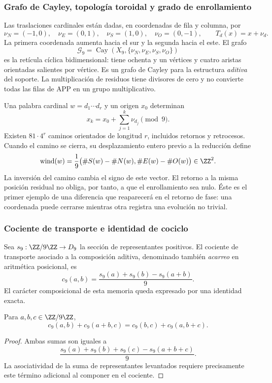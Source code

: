 \subsubsection{Grafo de Cayley, topología toroidal y grado de enrollamiento}

Las traslaciones cardinales están dadas, en coordenadas de fila y columna, por
\[
 \nu_N=(-1,0),\quad\nu_E=(0,1),\quad
 \nu_S=(1,0),\quad\nu_O=(0,-1),\qquad T_d(x)=x+\nu_d.
\]
La primera coordenada aumenta hacia el sur y la segunda hacia el este. El grafo
\[
 \mathscr G_9=\operatorname{Cay}(X_9,\{\nu_N,\nu_E,\nu_S,\nu_O\})
\]
es la retícula cíclica bidimensional: tiene ochenta y un vértices y cuatro aristas orientadas salientes por vértice. Es un grafo de Cayley para la estructura \emph{aditiva} del soporte. La multiplicación de residuos tiene divisores de cero y no convierte todas las filas de APP en un grupo multiplicativo.

Una palabra cardinal \(w=d_1\cdots d_r\) y un origen \(x_0\) determinan
\[
 x_k=x_0+\sum_{j=1}^k\nu_{d_j}\pmod9.
\]
Existen \(81\cdot4^r\) caminos orientados de longitud \(r\), incluidos retornos y retrocesos. Cuando el camino se cierra, su desplazamiento entero previo a la reducción define
\begin{equation}
 \operatorname{wind}(w)=\frac19
 \bigl(\#S(w)-\#N(w),\#E(w)-\#O(w)\bigr)\in\ZZ^2.
\end{equation}
La inversión del camino cambia el signo de este vector. El retorno a la misma posición residual no obliga, por tanto, a que el enrollamiento sea nulo. Éste es el primer ejemplo de una diferencia que reaparecerá en el retorno de fase: una coordenada puede cerrarse mientras otra registra una evolución no trivial.

\subsubsection{Cociente de transporte e identidad de cociclo}

Sea \(s_9:\ZZ/9\ZZ\to D_9\) la sección de representantes positivos. El cociente de transporte asociado a la composición aditiva, denominado también \emph{acarreo} en aritmética posicional, es
\[
 c_9(a,b)=\frac{s_9(a)+s_9(b)-s_9(a+b)}9.
\]
El carácter composicional de esta memoria queda expresado por una identidad exacta.

\begin{lemma}
Para \(a,b,c\in\ZZ/9\ZZ\),
\[
 c_9(a,b)+c_9(a+b,c)=c_9(b,c)+c_9(a,b+c).
\]
\end{lemma}
\begin{proof}
Ambas sumas son iguales a
\[
 \frac{s_9(a)+s_9(b)+s_9(c)-s_9(a+b+c)}9.
\]
La asociatividad de la suma de representantes levantados requiere precisamente este término adicional al componer en el cociente.
\end{proof}

